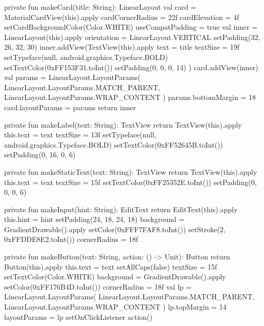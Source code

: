 {    private fun makeCard(title: String): LinearLayout {
        val card = MaterialCardView(this).apply {
            cardCornerRadius = 22f
            cardElevation = 4f
            setCardBackgroundColor(Color.WHITE)
            useCompatPadding = true
        }
        val inner = LinearLayout(this).apply {
            orientation = LinearLayout.VERTICAL
            setPadding(32, 26, 32, 30)
        }
        inner.addView(TextView(this).apply {
            text = title
            textSize = 19f
            setTypeface(null, android.graphics.Typeface.BOLD)
            setTextColor(0xFF153F31.toInt())
            setPadding(0, 0, 0, 14)
        })
        card.addView(inner)
        val params = LinearLayout.LayoutParams(
            LinearLayout.LayoutParams.MATCH_PARENT,
            LinearLayout.LayoutParams.WRAP_CONTENT
        )
        params.bottomMargin = 18
        card.layoutParams = params
        return inner
    }

    private fun makeLabel(text: String): TextView {
        return TextView(this).apply {
            this.text = text
            textSize = 13f
            setTypeface(null, android.graphics.Typeface.BOLD)
            setTextColor(0xFF52645B.toInt())
            setPadding(0, 16, 0, 6)
        }
    }

    private fun makeStaticText(text: String): TextView {
        return TextView(this).apply {
            this.text = text
            textSize = 15f
            setTextColor(0xFF25352E.toInt())
            setPadding(0, 0, 0, 6)
        }
    }

    private fun makeInput(hint: String): EditText {
        return EditText(this).apply {
            this.hint = hint
            setPadding(24, 18, 24, 18)
            background = GradientDrawable().apply {
                setColor(0xFFF7FAF8.toInt())
                setStroke(2, 0xFFDDE8E2.toInt())
                cornerRadius = 18f
            }
        }
    }

    private fun makeButton(text: String, action: () -> Unit): Button {
        return Button(this).apply {
            this.text = text
            setAllCaps(false)
            textSize = 15f
            setTextColor(Color.WHITE)
            background = GradientDrawable().apply {
                setColor(0xFF176B4D.toInt())
                cornerRadius = 18f
            }
            val lp = LinearLayout.LayoutParams(
                LinearLayout.LayoutParams.MATCH_PARENT,
                LinearLayout.LayoutParams.WRAP_CONTENT
            )
            lp.topMargin = 14
            layoutParams = lp
            setOnClickListener { action() }
        }
    }

}
